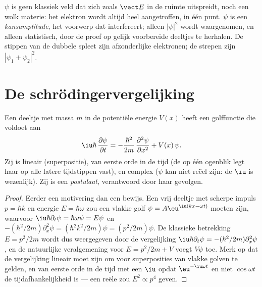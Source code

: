 \begin{remark}\label{rem:b2:schrodinger-wave-functions:not}
$\psi$ is geen klassiek veld dat zich zoals $\vect E$ in de ruimte
uitspreidt, noch een
wolk materie: het elektron wordt altijd heel aangetroffen, in één punt.
$\psi$ is een \emph{kansamplitude}, het voorwerp dat
interfereert; alleen $|\psi|^2$ wordt waargenomen, en alleen statistisch, door
de proef op gelijk voorbereide deeltjes te herhalen. De stippen
van de dubbele spleet zijn afzonderlijke elektronen; de strepen zijn
$|\psi_1 +
\psi_2|^2$.
\end{remark}

\section{De schrödingervergelijking}

\begin{theorem}[Schrödingervergelijking]\label{thm:b2:schrodinger-wave-functions:equation}
Een deeltje met massa $m$ in de potentiële energie $V(x)$ heeft een golf\-functie
die voldoet aan
\[
\iu\hbar\,\frac{\partial\psi}{\partial t} = -\frac{\hbar^2}{2m}\,\frac{\partial^2\psi}{\partial x^2} + V(x)\,\psi .
\]
Zij is lineair (superpositie), van eerste orde in de tijd (de 
op één ogenblik legt haar op alle latere tijdstippen vast), en complex ($\psi$
kan niet reëel zijn: de $\iu$ is wezenlijk). Zij is een \emph{postulaat},
verantwoord door haar gevolgen.
\end{theorem}

\begin{proof}
Eerder een motivering dan een bewijs. Een vrij deeltje met scherpe impuls
$p = \hbar k$ en energie $E = \hbar\omega$ zou een vlakke golf
$\psi =
A\eu^{\iu(kx - \omega t)}$ moeten zijn, waarvoor
$\iu\hbar\partial_t\psi = \hbar\omega\psi =
E\psi$ en
$-(\hbar^2/2m)\partial_x^2\psi = (\hbar^2k^2/2m)\psi = (p^2/2m)\psi$.
De klassieke betrekking $E = p^2/2m$ wordt dus weergegeven door de vergelijking
$\iu\hbar\partial_t\psi = -(\hbar^2/2m)\partial_x^2\psi$, en de natuurlijke
veralgemening voor $E = p^2/2m + V$ voegt $V\psi$ toe. Merk op dat de
vergelijking lineair moet zijn om voor superposities van vlakke golven te gelden, en
van eerste orde in de tijd met een $\iu$ opdat $\eu^{-\iu\omega t}$ en niet
$\cos\omega t$ de tijdafhankelijkheid is --- een reële  zou
$E^2 \propto p^4$ geven.
\end{proof}

